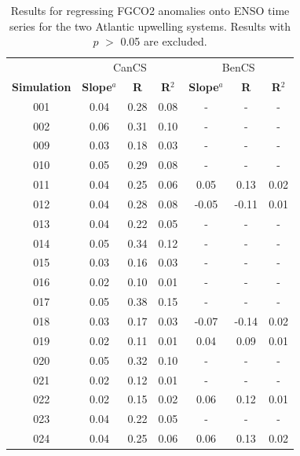 \documentclass[12pt]{article}
\begin{document}
\newpage
\begin{table}[!h]
	\centering
	\caption{Results for regressing FGCO2 anomalies onto ENSO time series for the two Atlantic upwelling systems. Results with $p$ $>$ 0.05 are excluded.}
	\begin{tabular}{c c c c | c c c}
		& \multicolumn{3}{c}{CanCS} & \multicolumn{3}{c}{BenCS} \\
		\cmidrule{2-4}\cmidrule{5-7}
		\textbf{Simulation} &  \textbf{Slope}$^{a}$  &  \textbf{R} &  \textbf{R$^{2}$} &  \textbf{Slope}$^{a}$  &  \textbf{R} &  \textbf{R$^{2}$}  \\
		\midrule
		001 &   0.04 &     0.28 &       0.08 &    - &      - &        - \\
		002 &   0.06 &     0.31 &       0.10 &    - &      - &        - \\
		009 &   0.03 &     0.18 &       0.03 &    - &      - &        - \\
		010 &   0.05 &     0.29 &       0.08 &    - &      - &        - \\
		011 &   0.04 &     0.25 &       0.06 &   0.05 &     0.13 &       0.02 \\
		012 &   0.04 &     0.28 &       0.08 &  -0.05 &    -0.11 &       0.01 \\
		013 &   0.04 &     0.22 &       0.05 &    - &      - &        - \\
		014 &   0.05 &     0.34 &       0.12 &    - &      - &        - \\
		015 &   0.03 &     0.16 &       0.03 &    - &      - &        - \\
		016 &   0.02 &     0.10 &       0.01 &    - &      - &        - \\
		017 &   0.05 &     0.38 &       0.15 &    - &      - &        - \\
		018 &   0.03 &     0.17 &       0.03 &  -0.07 &    -0.14 &       0.02 \\
		019 &   0.02 &     0.11 &       0.01 &   0.04 &     0.09 &       0.01 \\
		020 &   0.05 &     0.32 &       0.10 &    - &      - &        - \\
		021 &   0.02 &     0.12 &       0.01 &    - &      - &        - \\
		022 &   0.02 &     0.15 &       0.02 &   0.06 &     0.12 &       0.01 \\
		023 &   0.04 &     0.22 &       0.05 &    - &      - &        - \\
		024 &   0.04 &     0.25 &       0.06 &   0.06 &     0.13 &       0.02 \\

\end{tabular}
\end{table}
\end{document}
